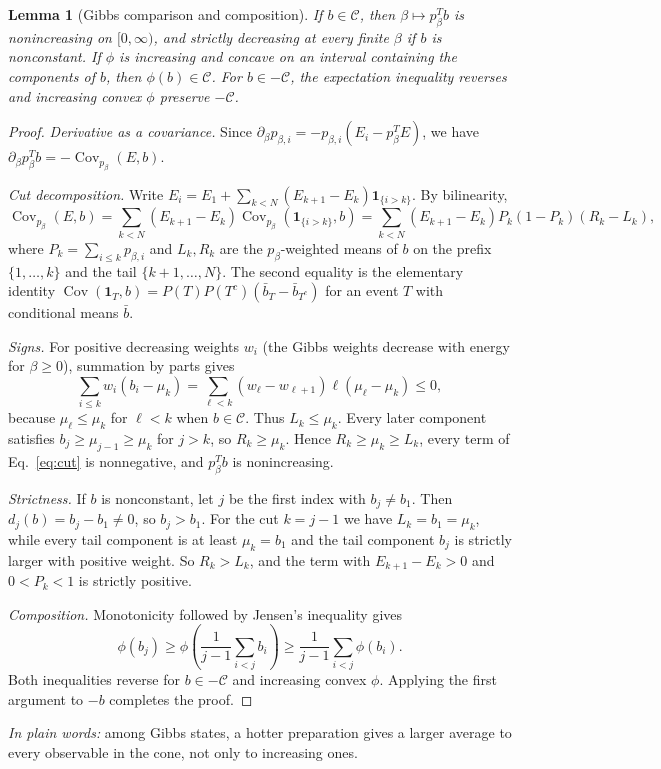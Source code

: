 \documentclass[11pt,a4paper]{article}
\newtheorem{lemma}[theorem]{Lemma}
\theoremstyle{remark}\newtheorem{remark}[theorem]{Remark}
\newcommand{\C}{\mathcal C}
\newcommand{\Cov}{\operatorname{Cov}}
\newcommand{\takeaway}[1]{\par\smallskip\noindent\textit{In plain words:} #1\par\smallskip}
\begin{document}
\begin{lemma}[Gibbs comparison and composition]\label{lem:gibbs}
If $b\in\C$, then $\beta\mapsto p_\beta^Tb$ is nonincreasing on $[0,\infty)$, and strictly decreasing at every finite $\beta$ if $b$ is nonconstant. If $\phi$ is increasing and concave on an interval containing the components of $b$, then $\phi(b)\in\C$. For $b\in-\C$, the expectation inequality reverses and increasing convex $\phi$ preserve $-\C$.
\end{lemma}
\begin{proof}
\emph{Derivative as a covariance.} Since $\partial_\beta p_{\beta,i}=-p_{\beta,i}(E_i-p_\beta^TE)$, we have $\partial_\beta p_\beta^Tb=-\Cov_{p_\beta}(E,b)$.

\emph{Cut decomposition.} Write $E_i=E_1+\sum_{k<N}(E_{k+1}-E_k)\mathbf1_{\{i>k\}}$. By bilinearity,
\begin{equation}
 \Cov_{p_\beta}(E,b)=\sum_{k<N}(E_{k+1}-E_k)\Cov_{p_\beta}(\mathbf1_{\{i>k\}},b)
 =\sum_{k<N}(E_{k+1}-E_k)P_k(1-P_k)(R_k-L_k),
 \label{eq:cut}
\end{equation}
where $P_k=\sum_{i\le k}p_{\beta,i}$ and $L_k,R_k$ are the $p_\beta$-weighted means of $b$ on the prefix $\{1,\ldots,k\}$ and the tail $\{k+1,\ldots,N\}$. The second equality is the elementary identity $\Cov(\mathbf1_T,b)=P(T)P(T^c)(\bar b_T-\bar b_{T^c})$ for an event $T$ with conditional means $\bar b$.

\emph{Signs.} For positive decreasing weights $w_i$ (the Gibbs weights decrease with energy for $\beta\ge0$), summation by parts gives
\begin{equation}
 \sum_{i\le k}w_i(b_i-\mu_k)
 =\sum_{\ell<k}(w_\ell-w_{\ell+1})\ell(\mu_\ell-\mu_k)\le0,
 \label{eq:abel}
\end{equation}
because $\mu_\ell\le\mu_k$ for $\ell<k$ when $b\in\C$. Thus $L_k\le\mu_k$. Every later component satisfies $b_j\ge\mu_{j-1}\ge\mu_k$ for $j>k$, so $R_k\ge\mu_k$. Hence $R_k\ge\mu_k\ge L_k$, every term of Eq.~\eqref{eq:cut} is nonnegative, and $p_\beta^Tb$ is nonincreasing.

\emph{Strictness.} If $b$ is nonconstant, let $j$ be the first index with $b_j\ne b_1$. Then $d_j(b)=b_j-b_1\ne0$, so $b_j>b_1$. For the cut $k=j-1$ we have $L_k=b_1=\mu_k$, while every tail component is at least $\mu_k=b_1$ and the tail component $b_j$ is strictly larger with positive weight. So $R_k>L_k$, and the term with $E_{k+1}-E_k>0$ and $0<P_k<1$ is strictly positive.

\emph{Composition.} Monotonicity followed by Jensen's inequality gives
\begin{equation}
 \phi(b_j)\ge\phi\!\left(\frac1{j-1}\sum_{i<j}b_i\right)
 \ge\frac1{j-1}\sum_{i<j}\phi(b_i).
 \label{eq:jensen}
\end{equation}
Both inequalities reverse for $b\in-\C$ and increasing convex $\phi$. Applying the first argument to $-b$ completes the proof.
\end{proof}
\takeaway{among Gibbs states, a hotter preparation gives a larger average to every observable in the cone, not only to increasing ones.}
\end{document}
